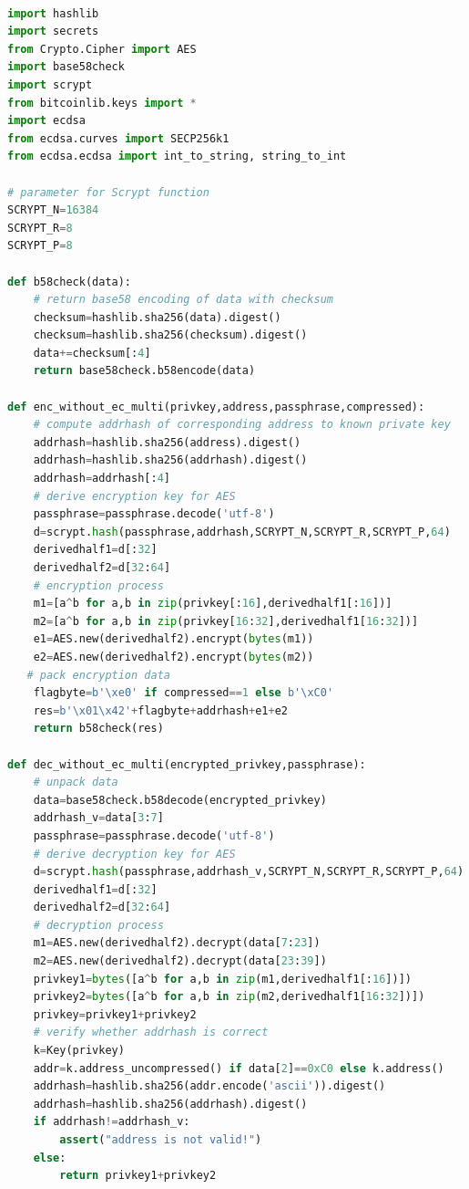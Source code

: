 \begin{lstlisting}[language=python, caption = 不使用EC乘法的加解密过程示例, label=lst-m1]

import hashlib 
import secrets
from Crypto.Cipher import AES
import base58check
import scrypt
from bitcoinlib.keys import *
import ecdsa
from ecdsa.curves import SECP256k1
from ecdsa.ecdsa import int_to_string, string_to_int

# parameter for Scrypt function
SCRYPT_N=16384
SCRYPT_R=8
SCRYPT_P=8

def b58check(data):
	# return base58 encoding of data with checksum
	checksum=hashlib.sha256(data).digest()
	checksum=hashlib.sha256(checksum).digest()
	data+=checksum[:4]
	return base58check.b58encode(data)

def enc_without_ec_multi(privkey,address,passphrase,compressed):
	# compute addrhash of corresponding address to known private key
	addrhash=hashlib.sha256(address).digest()
	addrhash=hashlib.sha256(addrhash).digest()
	addrhash=addrhash[:4]
	# derive encryption key for AES
	passphrase=passphrase.decode('utf-8')
	d=scrypt.hash(passphrase,addrhash,SCRYPT_N,SCRYPT_R,SCRYPT_P,64)
	derivedhalf1=d[:32]
	derivedhalf2=d[32:64]
	# encryption process
	m1=[a^b for a,b in zip(privkey[:16],derivedhalf1[:16])]
	m2=[a^b for a,b in zip(privkey[16:32],derivedhalf1[16:32])]
	e1=AES.new(derivedhalf2).encrypt(bytes(m1))
	e2=AES.new(derivedhalf2).encrypt(bytes(m2))
   # pack encryption data
	flagbyte=b'\xe0' if compressed==1 else b'\xC0'
	res=b'\x01\x42'+flagbyte+addrhash+e1+e2
	return b58check(res)
	
def dec_without_ec_multi(encrypted_privkey,passphrase):
	# unpack data 
	data=base58check.b58decode(encrypted_privkey)
	addrhash_v=data[3:7]
	passphrase=passphrase.decode('utf-8')
	# derive decryption key for AES
	d=scrypt.hash(passphrase,addrhash_v,SCRYPT_N,SCRYPT_R,SCRYPT_P,64)
	derivedhalf1=d[:32]
	derivedhalf2=d[32:64]
	# decryption process
	m1=AES.new(derivedhalf2).decrypt(data[7:23])
	m2=AES.new(derivedhalf2).decrypt(data[23:39])
	privkey1=bytes([a^b for a,b in zip(m1,derivedhalf1[:16])])
	privkey2=bytes([a^b for a,b in zip(m2,derivedhalf1[16:32])])
	privkey=privkey1+privkey2
	# verify whether addrhash is correct
	k=Key(privkey)
	addr=k.address_uncompressed() if data[2]==0xC0 else k.address()
	addrhash=hashlib.sha256(addr.encode('ascii')).digest()
	addrhash=hashlib.sha256(addrhash).digest()
	if addrhash!=addrhash_v:
		assert("address is not valid!")
	else:
		return privkey1+privkey2
\end{lstlisting}


